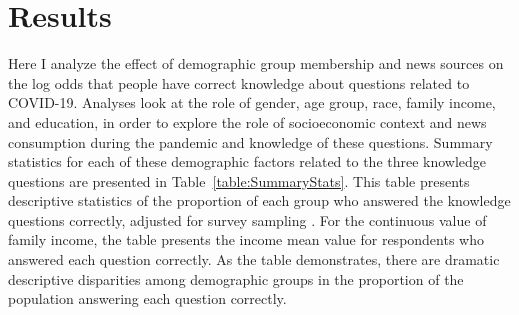 \documentclass[11pt]{article}
\begin{document}





\section{Results}\label{sec:results}

Here I analyze the effect of demographic group membership and news sources on the log odds that people have correct knowledge about questions related to COVID-19. Analyses look at the role of gender, age group, race, family income, and education, in order to explore the role of socioeconomic context and news consumption during the pandemic and knowledge of these questions.
Summary statistics for each of these demographic factors related to the three knowledge questions are presented in Table~\ref{table:SummaryStats}. This table presents descriptive statistics of the proportion of each group who answered the knowledge questions correctly, adjusted for survey sampling \citep{UCLASurveyDataAnalysis}. For the continuous value of family income, the table presents the income mean value for respondents who answered each question correctly. As the table demonstrates, there are dramatic descriptive disparities among demographic groups in the proportion of the population answering each question correctly.
\end{document}
